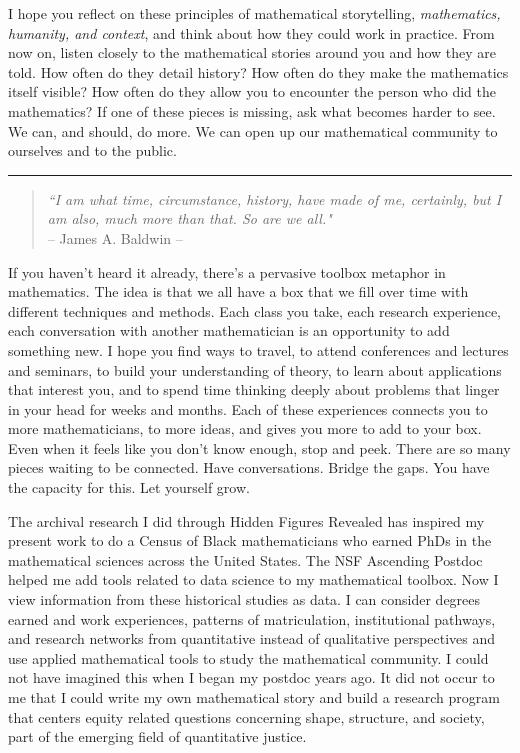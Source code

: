 \documentclass[pdflatex,sn-mathphys-num]{sn-jnl}%
\newcommand{\letterbreak}{%
    \par\bigskip
    \noindent\rule{\textwidth}{0.4pt}
    \bigskip
}
\begin{document}
 I hope you reflect on these principles of mathematical storytelling, \emph{mathematics, humanity, and context}, and think about how they could work in practice. From now on, listen closely to the mathematical stories around you and how they are told. How often do they detail history? How often do they make the mathematics itself visible? How often do they allow you to encounter the person who did the mathematics? If one of these pieces is missing, ask what becomes harder to see. We can, and should, do more. We can open up our mathematical community to ourselves and to the public.



\letterbreak


\begin{quote}
\emph{``I am what time, circumstance, history, have made of me, certainly, but I am also, much more than that. So are we all."}\\
    
\hfill -- James A. Baldwin \cite{baldwin1984notes} --
\end{quote}

If you haven't heard it already, there's a pervasive toolbox metaphor in mathematics. The idea is that we all have a box that we fill over time with different techniques and methods. Each class you take, each research experience, each conversation with another mathematician is an opportunity to add something new. I hope you find ways to travel, to attend conferences and lectures and seminars, to build your understanding of theory, to learn about applications that interest you, and to spend time thinking deeply about problems that linger in your head for weeks and months. Each of these experiences connects you to more mathematicians, to more ideas, and gives you more to add to your box. Even when it feels like you don't know enough, stop and peek. There are so many pieces waiting to be connected. Have conversations. Bridge the gaps. You have the capacity for this. Let yourself grow.

The archival research I did through Hidden Figures Revealed has inspired my present work to do a Census of Black mathematicians who earned PhDs in the mathematical sciences across the United States. The NSF Ascending Postdoc helped me add tools related to data science to my mathematical toolbox. Now I view information from these historical studies as data. I can consider degrees earned and work experiences, patterns of matriculation, institutional pathways, and research networks from quantitative instead of qualitative perspectives and use applied mathematical tools to study the mathematical community. I could not have imagined this when I began my postdoc years ago. It did not occur to me that I could write my own mathematical story and build a research program that centers equity related questions concerning shape, structure, and society, part of the emerging field of quantitative justice.
\end{document}
